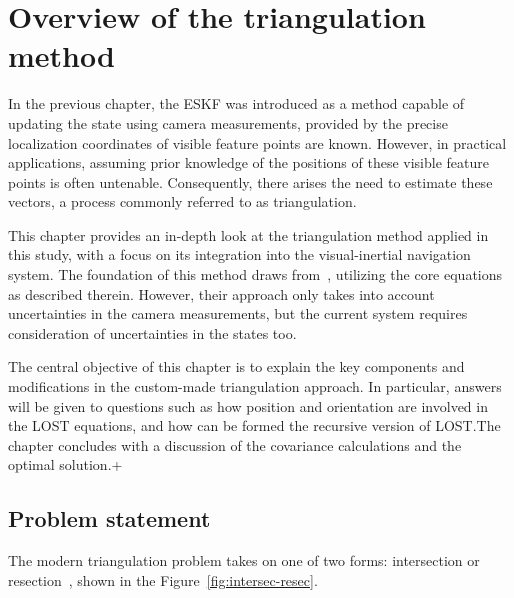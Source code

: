 \chapter{Overview of the triangulation method}\label{chap:LOST}

In the previous chapter, the ESKF was introduced as a method capable of updating the state using camera measurements, provided by the precise localization coordinates of visible feature points are known. However, in practical applications, assuming prior knowledge of the positions of these visible feature points is often untenable. Consequently, there arises the need to estimate these vectors, a process commonly referred to as triangulation.

This chapter provides an in-depth look at the triangulation method applied in this study, with a focus on its integration into the visual-inertial navigation system. The foundation of this method draws from~\cite{absolute-triangulation}, utilizing the core equations as described therein. However, their approach only takes into account uncertainties in the camera measurements, but the current system requires consideration of uncertainties in the states too.

The central objective of this chapter is to explain the key components and modifications in the custom-made triangulation approach. In particular, answers will be given to questions such as how position and orientation are involved in the LOST equations, and how can be formed the recursive version of LOST.\@ The chapter concludes with a discussion of the covariance calculations and the optimal solution.+

\section{Problem statement}

The modern triangulation problem takes on one of two forms: intersection or resection~\cite{ResectionInSurvey_1918}, shown in the Figure~\ref{fig:intersec-resec}.


